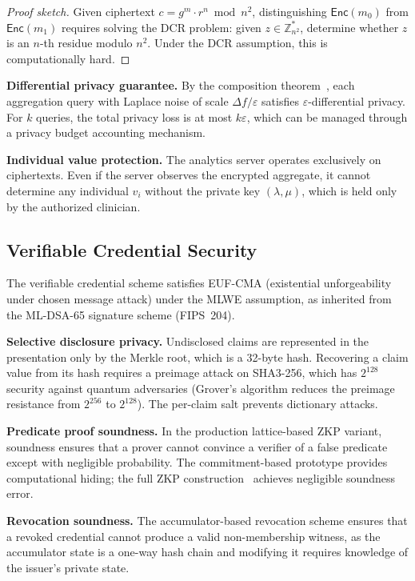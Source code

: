 \documentclass[conference,10pt]{IEEEtran}
\newcommand{\mldsa}{\textsf{ML-DSA}}
\newcommand{\shaiii}{\textsf{SHA3-256}}
\newcommand{\Enc}{\mathsf{Enc}}
\begin{document}
\begin{proof}[Proof sketch]
Given ciphertext $c = g^m \cdot r^n \bmod n^2$, distinguishing $\Enc(m_0)$ from $\Enc(m_1)$ requires solving the DCR problem: given $z \in \mathbb{Z}_{n^2}^*$, determine whether $z$ is an $n$-th residue modulo $n^2$. Under the DCR assumption, this is computationally hard.
\end{proof}

\textbf{Differential privacy guarantee.} By the composition theorem~\cite{dwork2014dp}, each aggregation query with Laplace noise of scale $\Delta f / \varepsilon$ satisfies $\varepsilon$-differential privacy. For $k$ queries, the total privacy loss is at most $k\varepsilon$, which can be managed through a privacy budget accounting mechanism.

\textbf{Individual value protection.} The analytics server operates exclusively on ciphertexts. Even if the server observes the encrypted aggregate, it cannot determine any individual $v_i$ without the private key $(\lambda, \mu)$, which is held only by the authorized clinician.

\subsection{Verifiable Credential Security}

\begin{theorem}[VC Unforgeability]
The verifiable credential scheme satisfies EUF-CMA (existential unforgeability under chosen message attack) under the MLWE assumption, as inherited from the \mldsa{}-65 signature scheme (FIPS~204).
\end{theorem}

\textbf{Selective disclosure privacy.} Undisclosed claims are represented in the presentation only by the Merkle root, which is a 32-byte hash. Recovering a claim value from its hash requires a preimage attack on \shaiii{}, which has $2^{128}$ security against quantum adversaries (Grover's algorithm reduces the preimage resistance from $2^{256}$ to $2^{128}$). The per-claim salt prevents dictionary attacks.

\textbf{Predicate proof soundness.} In the production lattice-based ZKP variant, soundness ensures that a prover cannot convince a verifier of a false predicate except with negligible probability. The commitment-based prototype provides computational hiding; the full ZKP construction~\cite{yang2022pqzkp} achieves negligible soundness error.

\textbf{Revocation soundness.} The accumulator-based revocation scheme ensures that a revoked credential cannot produce a valid non-membership witness, as the accumulator state is a one-way hash chain and modifying it requires knowledge of the issuer's private state.
\end{document}
